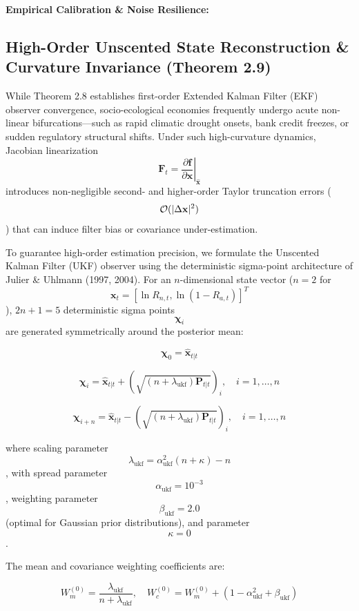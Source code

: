 \documentclass[preprint,12pt,authoryear]{elsarticle}
\theoremstyle{definition}
\begin{document}
\textbf{Empirical Calibration \& Noise Resilience:}

\subsection{High-Order Unscented State Reconstruction \& Curvature Invariance (Theorem 2.9)}

While Theorem 2.8 establishes first-order Extended Kalman Filter (EKF) observer convergence, socio-ecological economies frequently undergo acute non-linear bifurcations—such as rapid climatic drought onsets, bank credit freezes, or sudden regulatory structural shifts. Under such high-curvature dynamics, Jacobian linearization $$\mathbf{F}_t = \left. \frac{\partial \mathbf{f}}{\partial \mathbf{x}} \right|_{\hat{\mathbf{x}}}$$ introduces non-negligible second- and higher-order Taylor truncation errors ($$\mathcal{O}(\\|\Delta \mathbf{x}\\|^2)$$) that can induce filter bias or covariance under-estimation.

To guarantee high-order estimation precision, we formulate the Unscented Kalman Filter (UKF) observer using the deterministic sigma-point architecture of Julier \& Uhlmann (1997, 2004). For an $n$-dimensional state vector ($n=2$ for $$\mathbf{x}_t = [\ln R_{n,t}, \ln(1 - R_{a,t})]^T$$), $2n+1 = 5$ deterministic sigma points $$\boldsymbol{\chi}_i$$ are generated symmetrically around the posterior mean:

$$\boldsymbol{\chi}_0 = \hat{\mathbf{x}}_{t|t}$$

$$\boldsymbol{\chi}_i = \hat{\mathbf{x}}_{t|t} + \left(\sqrt{(n + \lambda_{\text{ukf}})\mathbf{P}_{t|t}}\right)_i, \quad i = 1, \dots, n$$

$$\boldsymbol{\chi}_{i+n} = \hat{\mathbf{x}}_{t|t} - \left(\sqrt{(n + \lambda_{\text{ukf}})\mathbf{P}_{t|t}}\right)_i, \quad i = 1, \dots, n$$

where scaling parameter $$\lambda_{\text{ukf}} = \alpha_{\text{ukf}}^2(n + \kappa) - n$$, with spread parameter $$\alpha_{\text{ukf}} = 10^{-3}$$, weighting parameter $$\beta_{\text{ukf}} = 2.0$$ (optimal for Gaussian prior distributions), and parameter $$\kappa = 0$$.

The mean and covariance weighting coefficients are:

$$W_m^{(0)} = \frac{\lambda_{\text{ukf}}}{n + \lambda_{\text{ukf}}}, \quad W_c^{(0)} = W_m^{(0)} + (1 - \alpha_{\text{ukf}}^2 + \beta_{\text{ukf}})$$
\end{document}
